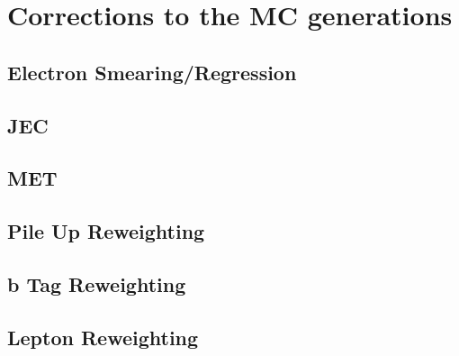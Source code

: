 \section{Corrections to the MC generations}
\label{sec:MCCor}

\subsection{Electron Smearing/Regression}
\label{ssec:eSmear}
\subsection{JEC}
\label{ssec:JECCor}
\subsection{MET}
\label{ssec:METCor}
\subsection{Pile Up Reweighting}
\label{ssec:PU}
\subsection{b Tag Reweighting}
\label{ssec:bTag}
\subsection{Lepton Reweighting}
\label{ssec:lepton}